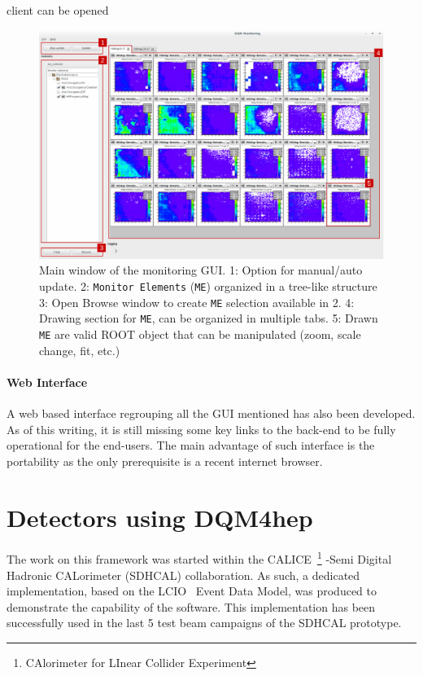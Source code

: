 \documentclass{webofc}
\begin{document}
client can be opened 
\begin{figure}
  \centering
  \includegraphics[width=.95\textwidth]{figs/MaintInterfaceGUI.pdf}
    \caption{\label{fig:DQMMainViz} Main window of the monitoring GUI.
    1: Option for manual/auto update.
    2: \texttt{Monitor Elements} (\texttt{ME}) organized in a tree-like structure
    3: Open Browse window to create \texttt{ME} selection available in 2.
    4: Drawing section for \texttt{ME}, can be organized in multiple tabs.
    5: Drawn \texttt{ME} are valid ROOT object that can be manipulated (zoom, scale change, fit, etc.)
    }
\end{figure}

\paragraph{Web Interface}\label{par:WebGUI}
A web based interface regrouping all the GUI mentioned has also been developed. As of this writing, it is still missing some key links to the back-end to be fully operational for the end-users. The main advantage of such interface is the portability as the only prerequisite is a recent internet browser. 

\section{Detectors using DQM4hep}
\label{sec:detectors}

The work on this framework was started within the CALICE~\footnote{CAlorimeter for LInear Collider Experiment} -Semi Digital Hadronic CALorimeter (SDHCAL) collaboration. As such, a dedicated implementation, based on the LCIO~\cite{LCIO} Event Data Model, was produced to demonstrate the capability of the software. This implementation has been successfully used in the last 5 test beam campaigns of the SDHCAL prototype.  
\end{document}
